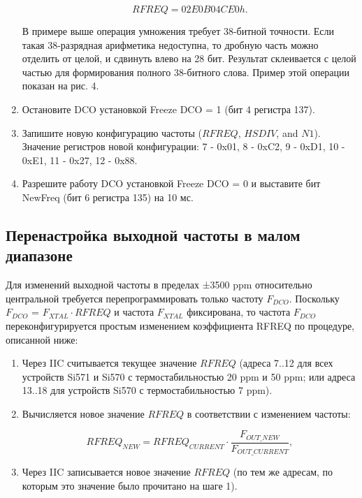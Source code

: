 \documentclass[a4paper,oneside ,14pt]{extreport}
\begin{document}
\begin{enumerate}
	\begin{equation}	
		RFREQ = 02E0B04CE0h.
	\end{equation}

	В примере выше операция умножения требует 38-битной точности. Если такая 38-разрядная арифметика недоступна, то дробную часть можно отделить от целой, и сдвинуть влево на 28 бит. Результат склеивается с целой частью для формирования полного 38-битного слова. Пример этой операции показан на рис. 4.

	\item Остановите DCO установкой Freeze DCO = 1 (бит 4 регистра 137).

	\item Запишите новую конфигурацию частоты (\(RFREQ\), \(HSDIV\), and \(N1\)). Значение регистров новой конфигурации: 
	7 - 0x01, 8 - 0xC2, 9 - 0xD1, 10 - 0xE1, 11 - 0x27, 12 - 0x88.
	\item Разрешите работу DCO установкой Freeze DCO = 0 и выставите бит NewFreq (бит 6 регистра 135) на 10 мс.
\end{enumerate}

\subsection{Перенастройка выходной частоты в малом диапазоне}

Для изменений выходной частоты в пределах ±3500 ppm относительно центральной требуется перепрограммировать 
только частоту \(F_{DCO}\). Поскольку \(F_{DCO}\) = \(F_{XTAL} \cdot RFREQ\) и частота \(F_{XTAL}\) фиксирована, то частота \(F_{DCO}\) переконфигурируется простым изменением коэффициента RFREQ по процедуре, описанной ниже:

\begin{enumerate}
	\item Через IIC считывается текущее значение \(RFREQ\) (адреса 7..12 для всех устройств Si571 и Si570 с термостабильностью 20 ppm и 50 ppm; или адреса 13..18 для устройств Si570 с термостабильностью 7 ppm).

	\item Вычисляется новое значение \(RFREQ\) в соответствии с изменением частоты:
	
	\begin{equation}	
		RFREQ_{NEW} =  RFREQ_{CURRENT} \cdot \frac{F_{OUT\_NEW}}{F_{OUT\_CURRENT}},
	\end{equation}

	\item Через IIC записывается новое значение \(RFREQ\) (по тем же адресам, по которым это значение было прочитано на шаге 1).
\end{enumerate}
\end{document}
